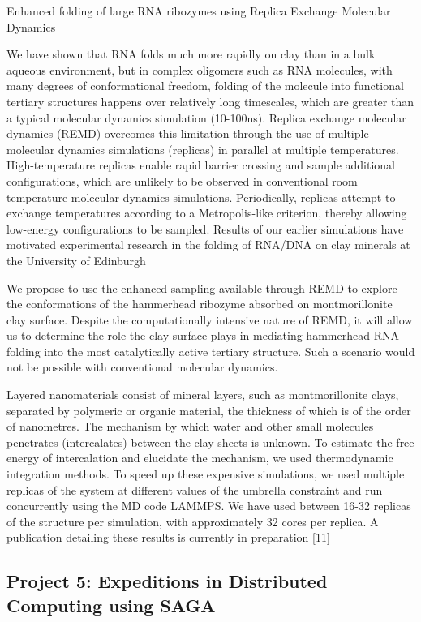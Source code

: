\documentclass[a4paper,10pt]{article}
\begin{document}
Enhanced folding of large RNA ribozymes using Replica Exchange Molecular Dynamics

We have shown that RNA folds much more rapidly on clay than in a bulk aqueous environment,
but in complex oligomers such as RNA molecules, with many degrees of conformational freedom, folding of the molecule into functional tertiary structures happens over relatively long timescales, which are greater than a typical molecular dynamics simulation (10-100ns). Replica exchange molecular dynamics (REMD) overcomes this limitation through the use of multiple molecular dynamics simulations (replicas) in parallel at multiple temperatures. High-temperature replicas enable rapid barrier crossing and sample additional configurations, which are unlikely to be observed in conventional room temperature molecular dynamics simulations. Periodically, replicas attempt to exchange temperatures according to a Metropolis-like criterion, thereby allowing low-energy configurations to be sampled. Results of our earlier simulations have motivated experimental research in the folding of RNA/DNA on clay minerals at the University of Edinburgh

We propose to use the enhanced sampling available through REMD to explore the conformations of the hammerhead ribozyme absorbed on montmorillonite clay surface. Despite the computationally intensive nature of REMD, it will allow us to determine the role the clay surface plays in mediating hammerhead RNA folding into the most catalytically active tertiary structure. Such a scenario would not be possible with conventional molecular dynamics.

Layered nanomaterials consist of mineral layers, such as montmorillonite clays, separated by polymeric or organic material, the thickness of which is of the order of nanometres. The mechanism by which water and other small molecules penetrates (intercalates) between the clay sheets is unknown. To estimate the free energy of intercalation and elucidate the mechanism, we used thermodynamic integration methods. To speed up these expensive simulations, we used multiple replicas of the system at different values of the umbrella constraint and run concurrently using the MD code LAMMPS. We have used between 16-32 replicas of the structure per simulation, with approximately 32 cores per replica. A publication detailing these results is currently in preparation [11]

\subsection{Project 5: Expeditions in Distributed Computing using SAGA}
\end{document}
